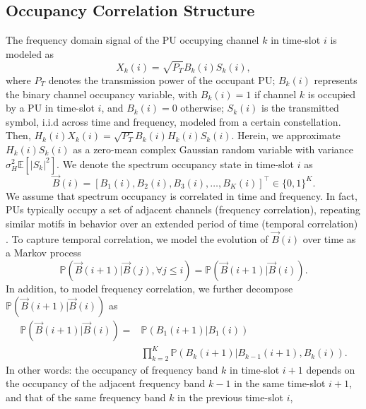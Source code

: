 \documentclass[10pt, twocolumn]{IEEEtran}
\begin{document}
\subsection{Occupancy Correlation Structure}\label{I.II}
The frequency domain signal of the PU occupying channel $k$ in time-slot $i$ is modeled as
\begin{equation}\label{3}
    X_{k}(i)=\sqrt{P_{T}}B_{k}(i)S_{k}(i),
\end{equation}
where $P_{T}$ denotes the transmission power of the occupant PU; $B_{k}(i)$ represents the binary channel occupancy variable, with $B_{k}(i){=}1$ if channel $k$ is occupied by a PU in time-slot $i$, and $B_{k}(i){=}0$ otherwise; $S_{k}(i)$ is the transmitted symbol, i.i.d across time and frequency, modeled from a certain constellation. Then, $H_{k}(i)X_{k}(i){=}\sqrt{P_{T}}B_{k}(i)H_{k}(i)S_{k}(i)$. Herein, we approximate $H_{k}(i)S_{k}(i)$ as a zero-mean complex Gaussian random variable with variance $\sigma_{H}^{2}\mathbb{E}[|S_{k}|^{2}]$. We denote the spectrum occupancy state in time-slot $i$ as
\begin{equation}\label{4}
    \vec{B}(i)=[B_{1}(i),B_{2}(i),B_{3}(i),\dots,B_{K}(i)]^{\intercal}{\in}\{0,1\}^{K}.
\end{equation}
We assume that spectrum occupancy is correlated in time and frequency. In fact, PUs typically occupy a set of adjacent channels (frequency correlation), repeating similar motifs in behavior over an extended period of time (temporal correlation) \cite{WCL:12, 4213046,McHenry:2006:CSO:1234388.1234389}. To capture temporal correlation, we model the evolution of $\vec{B}(i)$ over time as a Markov process
\begin{equation}\label{5}
    \mathbb{P}(\vec{B}(i+1)|\vec{B}(j),\forall j \leq i)=\mathbb{P}(\vec{B}(i+1)|\vec{B}(i)).
\end{equation}
In addition, to model frequency correlation, we further decompose $\mathbb{P}(\vec{B}(i+1)|\vec{B}(i))$ as
\begin{equation}\label{6}
    \begin{aligned}
        \mathbb{P}(\vec{B}(i{+}1){|}\vec{B}(i)){=}&\mathbb{P}(B_{1}(i{+}1)|B_{1}(i))\\&\prod_{k{=}2}^{K}\mathbb{P}(B_{k}(i{+}1){|}B_{k{-}1}(i{+}1),B_{k}(i)).
    \end{aligned}
\end{equation}
In other words: the occupancy of frequency band $k$ in time-slot $i+1$ depends on the occupancy of the adjacent frequency band $k-1$ in the same time-slot $i+1$, and that of the same frequency band $k$ in the previous time-slot $i$,
\end{document}
